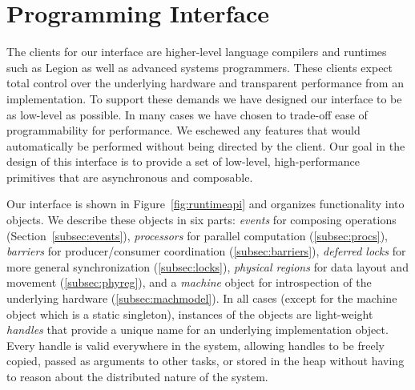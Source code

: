 
\section{Programming Interface}
\label{sec:interface}
The clients for our interface are higher-level language
compilers and runtimes such as Legion\cite{Legion12} as well as 
advanced systems programmers.  These clients expect total control
over the underlying hardware and transparent performance from an
implementation.  To support these demands we have designed our interface
to be as low-level as possible.  In many cases we have chosen to trade-off
ease of programmability for performance.  We eschewed any features that would
automatically be performed without being directed by the client.
Our goal in the design of this interface is to provide a set of low-level,
high-performance primitives that are asynchronous and composable.

Our interface is shown in Figure~\ref{fig:runtimeapi} and organizes functionality into objects.  We describe
these objects in six parts: {\em events} for composing operations 
(Section~\ref{subsec:events}), {\em processors} for parallel computation 
(\ref{subsec:procs}), {\em barriers} for producer/consumer coordination (\ref{subsec:barriers}),
{\em deferred locks} for more general synchronization
(\ref{subsec:locks}), {\em physical regions} for data layout and movement
(\ref{subsec:phyreg}), and a {\em machine} object for introspection of the underlying
hardware (\ref{subsec:machmodel}).  In all cases (except for the
machine object which is a static singleton), instances of the objects
are light-weight {\em handles} that provide a unique name for an underlying
implementation object.
Every handle is valid everywhere in the system, allowing handles to be freely copied,
passed as arguments to other tasks, or stored in the heap
without having to reason about the distributed nature of the system.


